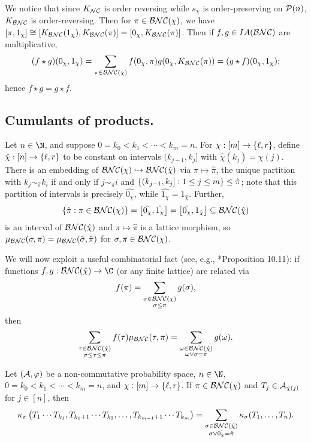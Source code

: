 We notice that since $K_{\mathcal{NC}}$ is order reversing while $s_\chi$ is order-preserving on $\mathcal{P}(n)$, $K_{\mathcal{BNC}}$ is order-reversing.
Then for $\pi \in \mathcal{BNC}(\chi)$, we have $[\pi, 1_\chi] \cong \left[K_{\mathcal{BNC}}(1_\chi), K_{\mathcal{BNC}}(\pi)\right] = \left[0_\chi, K_{\mathcal{BNC}}(\pi)\right]$.
Then if $f, g \in IA(\mathcal{BNC})$ are multiplicative,
$$(f\star g)(0_\chi, 1_\chi) = \sum_{\pi \in \mathcal{BNC}(\chi)} f(0_\chi, \pi)g(0_\chi, K_{\mathcal{BNC}}(\pi)) = (g\star f)(0_\chi, 1_\chi);$$
hence $f\star g = g\star f$.



\subsection{Cumulants of products.}
Let $n \in \N$, and suppose $0 = k_0 < k_1 < \cdots < k_m = n$.
For $\chi : [m] \to \left\{\ell, r\right\}$, define $\hat\chi : [n] \to \left\{\ell, r\right\}$ to be constant on intervals $(k_{j-1}, k_{j}]$ with $\hat\chi(k_j) = \chi(j)$.
There is an embedding of $\mathcal{BNC}(\chi) \hookrightarrow \mathcal{BNC}(\hat\chi)$ via $\pi \mapsto \hat\pi$, the unique partition with $k_j \sim_{\hat\pi} k_i$ if and only if $j \sim_\pi i$ and $\left\{(k_{j-1}, k_j] : 1 \leq j \leq m\right\} \leq \hat\pi$; note that this partition of intervals is precisely $\hat{0_\chi}$, while $\hat{1_\chi} = 1_{\hat\chi}$.
Further,
$$\left\{\hat\pi : \pi \in \mathcal{BNC}(\chi)\right\} = \left[\hat{0_\chi}, \hat{1_\chi}\right] = \left[\hat{0_\chi}, 1_{\hat\chi}\right] \subseteq\mathcal{BNC}(\hat\chi)$$
is an interval of $\mathcal{BNC}(\hat\chi)$ and $\pi \mapsto \hat\pi$ is a lattice morphism, so $\mu_{\mathcal{BNC}}(\sigma, \pi) = \mu_{\mathcal{BNC}}(\hat\sigma, \hat\pi)$ for $\sigma, \pi \in \mathcal{BNC}(\chi)$.

We will now exploit a useful combinatorial fact (see, e.g., \cite{nica2006lectures}*{Proposition 10.11}): if functions $f, g : \BNC(\hat\chi) \to \C$ (or any finite lattice) are related via
$$f(\pi) = \sum_{\substack{\sigma\in\mathcal{BNC}(\chi) \\ \sigma\leq\pi}} g(\sigma),$$
then
$$\sum_{\substack{\tau\in\mathcal{BNC}(\hat\chi) \\ \sigma\leq\tau\leq\pi}} f(\tau)\mu_{\mathcal{BNC}}(\tau, \pi) = \sum_{\substack{\omega\in\mathcal{BNC}(\hat\chi) \\ \omega \vee \sigma = \pi}} g(\omega).$$

\begin{proposition}
	\label{prop:multicumulantplicationthingywhateverihatelabelsnowsosueme}
	Let $(\mathcal{A}, \varphi)$ be a non-commutative probability space, $n \in \N$, $0 = k_0 < k_1 < \cdots < k_m = n$, and $\chi : [m] \to \left\{\ell, r\right\}$.
	If $\pi \in \mathcal{BNC}(\chi)$ and $T_j \in \mathcal{A}_{\hat\chi(j)}$ for $j \in [n]$, then
	$$\kappa_\pi\left(T_1\cdots T_{k_1}, T_{k_1+1} \cdots T_{k_2}, \ldots, T_{k_{m-1}+1}\cdots T_{k_m}\right)
	= \sum_{\substack{\sigma \in \mathcal{BNC}(\hat\chi) \\ \sigma \vee \hat{0_\chi} = \hat\pi}} \kappa_\sigma(T_1, \ldots, T_n).$$
\end{proposition}

